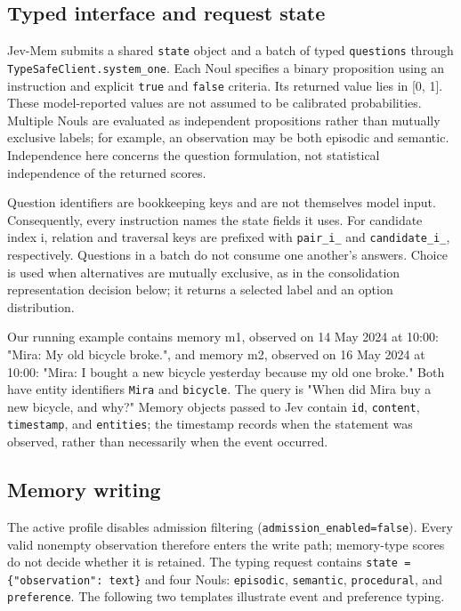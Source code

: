 \documentclass[11pt]{article}
\begin{document}
\subsection{Typed interface and request state}

Jev-Mem submits a shared \texttt{state} object and a batch of typed \texttt{questions} through \texttt{TypeSafeClient.system\_one}. Each Noul specifies a binary proposition using an instruction and explicit \texttt{true} and \texttt{false} criteria. Its returned value lies in [0, 1]. These model-reported values are not assumed to be calibrated probabilities. Multiple Nouls are evaluated as independent propositions rather than mutually exclusive labels; for example, an observation may be both episodic and semantic. Independence here concerns the question formulation, not statistical independence of the returned scores.

Question identifiers are bookkeeping keys and are not themselves model input. Consequently, every instruction names the state fields it uses. For candidate index i, relation and traversal keys are prefixed with \texttt{pair\_i\_} and \texttt{candidate\_i\_}, respectively. Questions in a batch do not consume one another's answers. Choice is used when alternatives are mutually exclusive, as in the consolidation representation decision below; it returns a selected label and an option distribution.

Our running example contains memory m1, observed on 14 May 2024 at 10:00: "Mira: My old bicycle broke.", and memory m2, observed on 16 May 2024 at 10:00: "Mira: I bought a new bicycle yesterday because my old one broke." Both have entity identifiers \texttt{Mira} and \texttt{bicycle}. The query is "When did Mira buy a new bicycle, and why?" Memory objects passed to Jev contain \texttt{id}, \texttt{content}, \texttt{timestamp}, and \texttt{entities}; the timestamp records when the statement was observed, rather than necessarily when the event occurred.

\subsection{Memory writing}

The active profile disables admission filtering (\texttt{admission\_enabled=false}). Every valid nonempty observation therefore enters the write path; memory-type scores do not decide whether it is retained. The typing request contains \texttt{state = \{"observation": text\}} and four Nouls: \texttt{episodic}, \texttt{semantic}, \texttt{procedural}, and \texttt{preference}. The following two templates illustrate event and preference typing.
\end{document}
